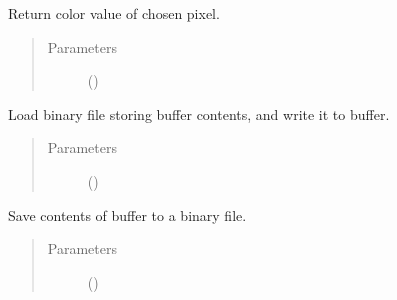\documentclass[letterpaper,10pt,english,openany,oneside]{sphinxmanual}
\begin{document}
\begin{fulllineitems}
\begin{fulllineitems}
\end{fulllineitems}



\begin{fulllineitems}
\sphinxAtStartPar
Return color value of chosen pixel.
\begin{quote}\begin{description}
\item[{Parameters}] \leavevmode
\sphinxAtStartPar
{} () \textendash{} 

\end{description}\end{quote}

\end{fulllineitems}



\begin{fulllineitems}
\sphinxAtStartPar
Load binary file storing buffer contents, and write it to buffer.
\begin{quote}\begin{description}
\item[{Parameters}] \leavevmode
\sphinxAtStartPar
{} () \textendash{} 

\end{description}\end{quote}

\end{fulllineitems}



\begin{fulllineitems}
\sphinxAtStartPar
Save contents of buffer to a binary file.
\begin{quote}\begin{description}
\item[{Parameters}] \leavevmode
\sphinxAtStartPar
{} () \textendash{} 


\end{description}
\end{quote}
\end{fulllineitems}
\end{fulllineitems}
\end{document}
